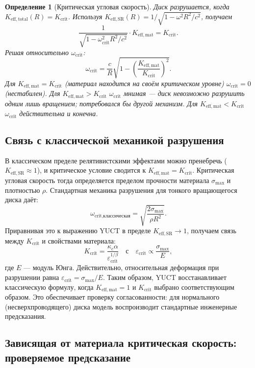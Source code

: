 \documentclass[12pt,a4paper]{article}
\newtheorem{definition}{Определение}[section]
\newcommand{\kappac}{\kappa_c}
\newcommand{\betaf}{\beta}
\newcommand{\Keffmat}{K_{\mathrm{eff,mat}}}
\newcommand{\Kefftot}{K_{\mathrm{eff,total}}}
\newcommand{\KeffSR}{K_{\mathrm{eff,SR}}}
\newcommand{\Kcrit}{K_{\mathrm{crit}}}
\begin{document}
	\begin{definition}[Критическая угловая скорость]
		Диск разрушается, когда \(\Kefftot(R) = \Kcrit\). Используя \(\KeffSR(R) = 1/\sqrt{1 - \omega^2 R^2/c^2}\), получаем
		\[
		\frac{1}{\sqrt{1 - \omega_{\text{crit}}^2 R^2/c^2}} \cdot \Keffmat = \Kcrit.
		\]
		Решая относительно \(\omega_{\text{crit}}\):
		\[
		\boxed{\omega_{\text{crit}} = \frac{c}{R} \sqrt{1 - \left( \frac{\Keffmat}{\Kcrit} \right)^2 }}.
		\]
		Для \(\Keffmat = \Kcrit\) (материал находится на своём критическом уровне) \(\omega_{\text{crit}} = 0\) (нестабилен). Для \(\Keffmat > \Kcrit\) \(\omega_{\text{crit}}\) мнимая — диск невозможно разрушить одним лишь вращением; потребовался бы другой механизм. Для \(\Keffmat < \Kcrit\) \(\omega_{\text{crit}}\) действительна и конечна.
	\end{definition}
	
	\subsection{Связь с классической механикой разрушения}
	
	В классическом пределе релятивистскими эффектами можно пренебречь (\(\KeffSR \approx 1\)), и критическое условие сводится к \(\Keffmat = \Kcrit\). Критическая угловая скорость тогда определяется пределом прочности материала \(\sigma_{\text{max}}\) и плотностью \(\rho\). Стандартная механика разрушения для тонкого вращающегося диска даёт:
	\[
	\omega_{\text{crit,классическая}} = \sqrt{\frac{2\sigma_{\text{max}}}{\rho R^2}}.
	\]
	Приравнивая это к выражению YUCT в пределе \(\KeffSR \to 1\), получаем связь между \(\Kcrit\) и свойствами материала:
	\[
	\Kcrit = \frac{\kappac \alpha}{\varepsilon_{\text{crit}}^{1/\betaf}} \quad \text{с} \quad \varepsilon_{\text{crit}} \propto \frac{\sigma_{\text{max}}}{E},
	\]
	где \(E\) — модуль Юнга. Действительно, относительная деформация при разрушении равна \(\varepsilon_{\text{crit}} = \sigma_{\text{max}}/E\). Таким образом, YUCT восстанавливает классическую формулу, когда \(\Keffmat = 1\) и \(\Kcrit\) выбрано соответствующим образом. Это обеспечивает проверку согласованности: для нормального (несверхпроводящего) диска модель воспроизводит стандартные инженерные предсказания.
	
	\subsection{Зависящая от материала критическая скорость: проверяемое предсказание}
	
\end{document}
